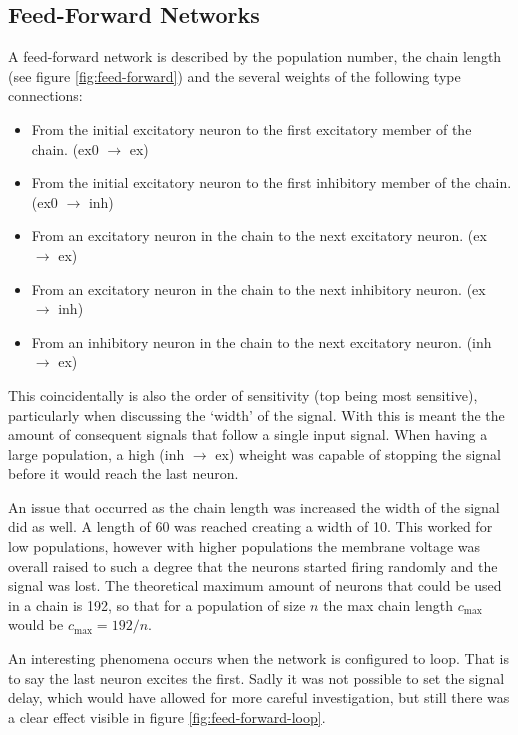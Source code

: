 \documentclass[10pt,a4paper]{article}
\begin{document}
\subsection{Feed-Forward Networks}
A feed-forward network is described by the population number, the chain length
(see figure \ref{fig:feed-forward}) and the several weights of the following
type connections:
\begin{itemize}
    \item From the initial excitatory neuron to the first excitatory member of the
        chain. (ex0 $\rightarrow$ ex)
    \item From the initial excitatory neuron to the first inhibitory member of the
        chain. (ex0 $\rightarrow$ inh)
    \item From an excitatory neuron in the chain to the next excitatory neuron.
        (ex $\rightarrow$ ex)
    \item From an excitatory neuron in the chain to the next inhibitory neuron.
        (ex $\rightarrow$ inh)
    \item From an inhibitory neuron in the chain to the next excitatory neuron.
        (inh $\rightarrow$ ex)
\end{itemize}
This coincidentally is also the order of sensitivity (top being most sensitive),
particularly when discussing the `width' of the signal. With this is meant the
the amount of consequent signals that follow a single input signal. When having
a large population, a high (inh $\rightarrow$ ex) wheight was capable of
stopping the signal before it would reach the last neuron.

An issue that occurred as the chain length was increased the width of the signal
did as well. A length of 60 was reached creating a width of 10. This worked for
low populations, however with higher populations the membrane voltage was
overall raised to such a degree that the neurons started firing randomly and the
signal was lost. The theoretical maximum amount of neurons that could be used in
a chain is 192, so that for a population of size $n$ the max chain length
$c_\text{max}$ would be $c_\text{max} = 192 / n$.

An interesting phenomena occurs when the network is configured to loop. That is
to say the last neuron excites the first. Sadly it was not possible to set the
signal delay, which would have allowed for more careful investigation, but still
there was a clear effect visible in figure \ref{fig:feed-forward-loop}.
\end{document}
